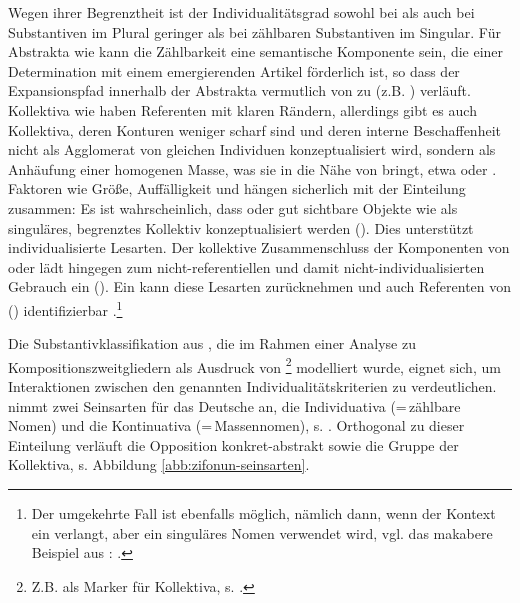 Wegen ihrer Begrenztheit ist der Individualitätsgrad  sowohl bei  als auch bei Substantiven  im Plural  geringer als bei zählbaren Substantiven  im  Singular. Für Abstrakta  wie  kann die Zählbarkeit eine semantische Komponente sein, die einer Determination mit einem emergierenden Artikel förderlich ist, so dass der Expansionspfad  innerhalb der Abstrakta  vermutlich von  zu  (z.B. ) verläuft. Kollektiva  wie  haben Referenten mit klaren Rändern, allerdings gibt es auch  Kollektiva, deren Konturen weniger scharf sind und deren interne Beschaffenheit nicht als Agglomerat von gleichen Individuen konzeptualisiert wird, sondern als Anhäufung einer homogenen Masse, was sie in die Nähe von  bringt, etwa  oder  \parencite[s.][120--121]{Zifonun2012}. 
Faktoren wie Größe, Auffälligkeit und  hängen sicherlich mit der Einteilung zusammen: Es ist wahrscheinlich, dass  oder gut sichtbare Objekte wie  als singuläres, begrenztes Kollektiv  konzeptualisiert werden (). Dies unterstützt individualisierte Lesarten. Der kollektive  Zusammenschluss der Komponenten von  oder  lädt hingegen zum nicht-referentiellen  und damit nicht-individualisierten  Gebrauch ein (). Ein  kann diese Lesarten zurücknehmen und auch Referenten von  () identifizierbar .\footnote{Der umgekehrte Fall ist ebenfalls möglich, nämlich dann, wenn der Kontext ein  verlangt, aber ein singuläres Nomen verwendet wird, vgl. das makabere Beispiel aus \textcite[81]{Corbett2000}: .} 

Die Substantivklassifikation  aus \textcite[104]{Zifonun2012}, die im Rahmen einer Analyse zu Kompositionszweitgliedern  als Ausdruck von  \footnote{Z.B. als Marker für  Kollektiva, s. \textcite[101]{Zifonun2012}.} modelliert wurde, eignet sich, um  Interaktionen zwischen den genannten Individualitätskriterien  zu verdeutlichen. \textcite[103]{Zifonun2012} nimmt \parencite[basierend auf den Ausführungen von][]{Rijkhoff1991,Rijkhoff2002} zwei Seinsarten für das Deutsche an, die Individuativa (=\,zählbare Nomen) und die Kontinuativa (=\,Massennomen), s. . Orthogonal zu dieser Einteilung verläuft die Opposition konkret-abstrakt   sowie die Gruppe der  Kollektiva, s. Abbildung \ref{abb:zifonun-seinsarten}.

